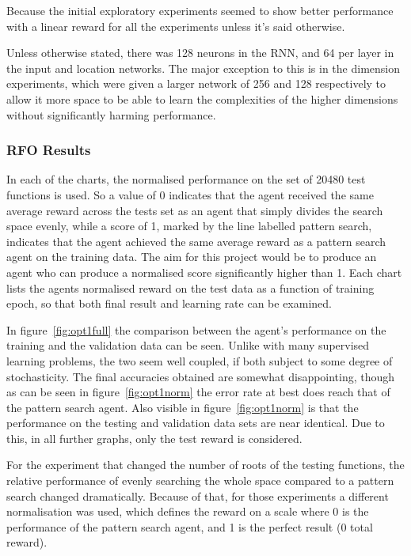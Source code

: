 Because the initial exploratory experiments seemed to show better performance with a linear reward for all the experiments unless it's said otherwise.

Unless otherwise stated, there was 128 neurons in the RNN, and 64 per layer in the input and location networks. The major exception to this is in the dimension experiments, which were given a larger network of 256 and 128 respectively to allow it more space to be able to learn the complexities of the higher dimensions without significantly harming performance.

\subsubsection{RFO Results}
In each of the charts, the normalised performance on the set of 20480 test functions is used. So a value of 0 indicates that the agent received the same average reward across the tests set as an agent that simply divides the search space evenly, while a score of 1, marked by the line labelled pattern search, indicates that the agent achieved the same average reward as a pattern search agent on the training data. The aim for this project would be to produce an agent who can produce a normalised score significantly higher than 1. Each chart lists the agents  normalised reward on the test data as a function of training epoch, so that both final result and learning rate can be examined.


In figure~\ref{fig:opt1full} the comparison between the agent's performance on the training and the validation data can be seen. Unlike with many supervised learning problems, the two seem well coupled, if both subject to some degree of stochasticity. The final accuracies obtained are somewhat disappointing, though as can be seen in figure~\ref{fig:opt1norm} the error rate at best does reach that of the pattern search agent. Also visible in figure~\ref{fig:opt1norm} is that the performance on the testing and validation data sets are near identical. Due to this, in all further graphs, only the test reward is considered.

For the experiment that changed the number of roots of the testing functions, the relative performance of evenly searching the whole space compared to a pattern search changed dramatically. Because of that, for those experiments a different normalisation was used, which defines the reward on a scale where 0 is the performance of the pattern search agent, and 1 is the perfect result (0 total reward).

